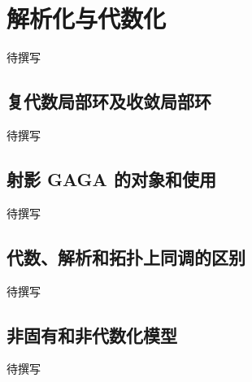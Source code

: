 
% 
% 

\section{解析化与代数化}
\label{g5:sec:3601}

待撰写

\subsection{复代数局部环及收敛局部环}
\label{g5:subsec:3601:01}
待撰写

\subsection{射影 GAGA 的对象和使用}
\label{g5:subsec:3601:02}
待撰写

\subsection{代数、解析和拓扑上同调的区别}
\label{g5:subsec:3601:03}
待撰写

\subsection{非固有和非代数化模型}
\label{g5:subsec:3601:04}
待撰写
